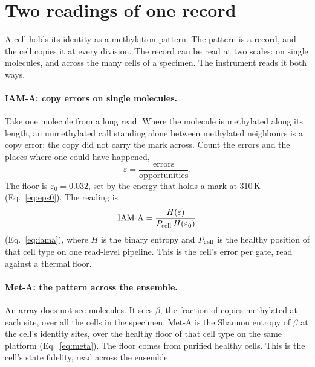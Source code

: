 \section{Two readings of one record}\label{sec:two_readings}

A cell holds its identity as a methylation pattern. The pattern is a record, and the cell copies it at every division. The record can be
read at two scales: on single molecules, and across the many cells of a specimen. The instrument reads it both ways.

\paragraph{IAM-A: copy errors on single molecules.} Take one molecule from a long read. Where the molecule is methylated along its length,
an unmethylated call standing alone between methylated neighbours is a copy error: the copy did not carry the mark across. Count the errors
and the places where one could have happened,
\begin{equation*}
\varepsilon=\frac{\text{errors}}{\text{opportunities}} .
\end{equation*}
\measured{} The floor is $\varepsilon_0=0.032$, set by the energy that holds a mark at 310\,K (Eq.~\eqref{eq:eps0}). \derived{} The reading is
\begin{equation*}
\text{IAM-A}=\frac{H(\varepsilon)}{P_{\rm cell}\,H(\varepsilon_0)}
\end{equation*}
(Eq.~\eqref{eq:iama}), where $H$ is the binary entropy and $P_{\rm cell}$ is the healthy position of that cell type on one read-level
pipeline. \calibrated{} This is the cell's error per gate, read against a thermal floor.

\paragraph{Met-A: the pattern across the ensemble.} An array does not see molecules. It sees $\beta$, the fraction of copies methylated at
each site, over all the cells in the specimen. Met-A is the Shannon entropy of $\beta$ at the cell's identity sites, over the healthy floor of
that cell type on the same platform (Eq.~\eqref{eq:meta}). The floor comes from purified healthy cells. \calibrated{} This is the cell's state
fidelity, read across the ensemble.

